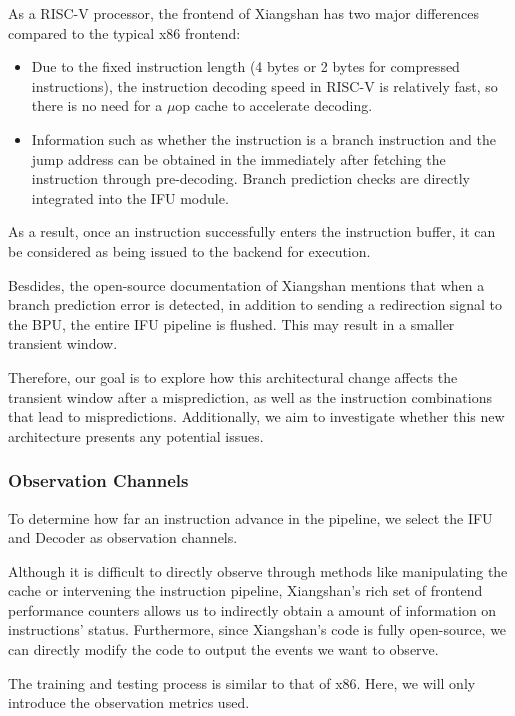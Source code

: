 As a RISC-V processor, the frontend of Xiangshan has two major differences compared to the typical x86 frontend:
\begin{itemize}
    \item Due to the fixed instruction length (4 bytes or 2 bytes for compressed instructions), the instruction decoding speed in RISC-V is relatively fast, so there is no need for a $\mu$op cache to accelerate decoding.
    \item Information such as whether the instruction is a branch instruction and the jump address can be obtained in the immediately after fetching the instruction through pre-decoding. Branch prediction checks are directly integrated into the IFU module.
\end{itemize}

As a result, once an instruction successfully enters the instruction buffer, it can be considered as being issued to the backend for execution.

Besdides, the open-source documentation of Xiangshan mentions that when a branch prediction error is detected, in addition to sending a redirection signal to the BPU, the entire IFU pipeline is flushed. This may result in a smaller transient window.

Therefore, our goal is to explore how this architectural change affects the transient window after a misprediction, as well as the instruction combinations that lead to mispredictions. Additionally, we aim to investigate whether this new architecture presents any potential issues.


\subsubsection{Observation Channels}

To determine how far an instruction advance in the pipeline, we select the IFU and Decoder as observation channels.

Although it is difficult to directly observe through methods like manipulating the cache or intervening the instruction pipeline, Xiangshan's rich set of frontend performance counters allows us to indirectly obtain a amount of information on instructions' status. Furthermore, since Xiangshan's code is fully open-source, we can directly modify the code to output the events we want to observe.

The training and testing process is similar to that of x86. Here, we will only introduce the observation metrics used.

